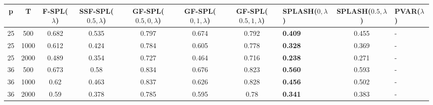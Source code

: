 \begin{tabular}{ccccccclcl}
\hline
  p  &  T   &  F-SPL($\lambda$)  &  SSF-SPL($0.5, \lambda$)  &  GF-SPL($0.5, 0, \lambda$)  &  GF-SPL($0, 1, \lambda$)  &  GF-SPL($0.5, 1, \lambda$)  & SPLASH($0, \lambda$)   &  SPLASH($0.5, \lambda$)  & PVAR($\lambda$)   \\
\hline
 25  & 500  &       0.682        &           0.535           &            0.797            &           0.674           &            0.792            & \textbf{0.409}         &          0.455           & -                 \\
 25  & 1000 &       0.612        &           0.424           &            0.784            &           0.605           &            0.778            & \textbf{0.328}         &          0.369           & -                 \\
 25  & 2000 &       0.489        &           0.354           &            0.727            &           0.464           &            0.716            & \textbf{0.238}         &          0.271           & -                 \\
 36  & 500  &       0.673        &           0.58            &            0.834            &           0.676           &            0.823            & \textbf{0.560}         &          0.593           & -                 \\
 36  & 1000 &        0.62        &           0.463           &            0.837            &           0.626           &            0.828            & \textbf{0.456}         &          0.502           & -                 \\
 36  & 2000 &        0.59        &           0.378           &            0.785            &           0.595           &            0.78             & \textbf{0.341}         &          0.383           & -                 \\
\hline
\end{tabular}